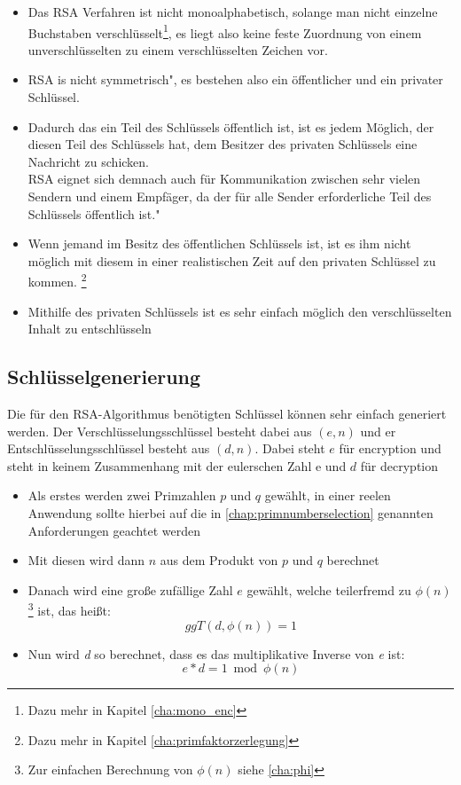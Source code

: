 \documentclass[12pt,a4paper]{scrartcl}
\begin{document}
	\begin{itemize}
	\item Das RSA Verfahren ist nicht monoalphabetisch, solange man nicht einzelne Buchstaben verschlüsselt\footnote{Dazu mehr in Kapitel \ref{cha:mono_enc}}, es liegt also keine feste Zuordnung von einem unverschlüsselten zu einem verschlüsselten Zeichen vor. \cite[S.9]{frauenhofer}
	\item \glqq RSA is nicht symmetrisch"\cite[S.9]{frauenhofer}, es bestehen also ein öffentlicher und ein privater Schlüssel.
	\item Dadurch das ein Teil des Schlüssels öffentlich ist, ist es jedem Möglich, der diesen Teil des Schlüssels hat, dem Besitzer des privaten Schlüssels eine Nachricht zu schicken.\\ \glqq RSA eignet sich demnach auch für Kommunikation zwischen sehr vielen Sendern und einem Empfäger, da der für alle Sender erforderliche Teil des Schlüssels öffentlich ist." \cite[S.9]{frauenhofer}
	
	\item Wenn jemand im Besitz des öffentlichen Schlüssels ist, ist es ihm nicht möglich mit diesem in einer realistischen Zeit auf den privaten Schlüssel zu kommen. \footnote{Dazu mehr in Kapitel \ref{cha:primfaktorzerlegung}}
	\item Mithilfe des privaten Schlüssels ist es sehr einfach möglich den verschlüsselten Inhalt zu entschlüsseln
	
	\end{itemize}
	\subsection{Schlüsselgenerierung}
Die für den RSA-Algorithmus benötigten Schlüssel können sehr einfach generiert werden. Der Verschlüsselungsschlüssel besteht dabei aus $(e, n)$ und er Entschlüsselungsschlüssel besteht aus $(d, n)$. Dabei steht $e$ für encryption und steht in keinem Zusammenhang mit der eulerschen Zahl e und $d$ für decryption 
\begin{itemize}
\item Als erstes werden zwei Primzahlen $p$ und $q$ gewählt, in einer reelen Anwendung sollte hierbei auf die in \ref{chap:primnumberselection} genannten Anforderungen geachtet werden  
\item Mit diesen wird dann $n$ aus dem Produkt von $p$ und $q$ berechnet
\item Danach wird eine große zufällige Zahl $e$ gewählt, welche teilerfremd zu ${\phi(n)}$\footnote{Zur einfachen Berechnung von ${\phi(n)}$ siehe \ref{cha:phi}} ist, das heißt:
$${ggT(d, \phi(n)) = 1}$$ 
\item Nun wird \textit{d} so berechnet, dass es das multiplikative Inverse von \textit{e} ist:
$${e * d = 1 \bmod \phi(n)}$$
\end{itemize}
\end{document}
